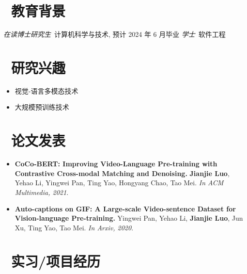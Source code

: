 \documentclass{resume}
\begin{document}


 
\section{\faGraduationCap\  教育背景}
\textit{在读博士研究生}\ 计算机科学与技术, 预计 2024 年 6 月毕业
\textit{学士}\ 软件工程

\section{\faEye\ 研究兴趣}
\begin{itemize}
\item 视觉-语言多模态技术
\item 大规模预训练技术
\end{itemize}

\section{\faFileText\  论文发表}

\begin{itemize}

 \item \textbf{CoCo-BERT: Improving Video-Language Pre-training with Contrastive Cross-modal Matching and Denoising.} \textbf{Jianjie Luo}, Yehao Li, Yingwei Pan, Ting Yao, Hongyang Chao, Tao Mei. \textit{In ACM Multimedia, 2021}.
 
 \item \textbf{Auto-captions on GIF: A Large-scale Video-sentence Dataset for Vision-language Pre-training.} Yingwei Pan, Yehao Li, \textbf{Jianjie Luo}, Jun Xu, Ting Yao, Tao Mei. \textit{In Arxiv, 2020}.
 
\end{itemize}


\section{\faUsers\ 实习/项目经历}
\role{研究型实习生}
\end{document}
